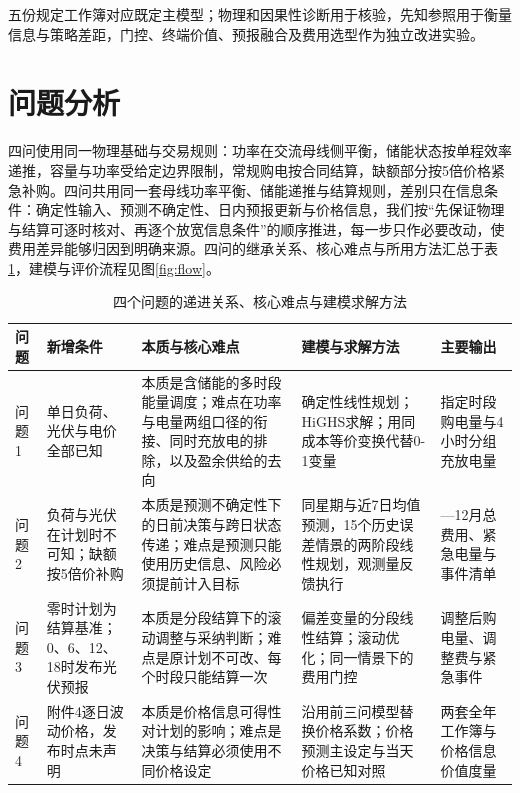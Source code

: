 \documentclass[UTF8,fontset=none,a4paper,zihao=-4]{ctexart}
\begin{document}
五份规定工作簿对应既定主模型；物理和因果性诊断用于核验，先知参照用于衡量信息与策略差距，门控、终端价值、预报融合及费用选型作为独立改进实验。

\section{问题分析}
四问使用同一物理基础与交易规则：功率在交流母线侧平衡，储能状态按单程效率递推，容量与功率受给定边界限制，常规购电按合同结算，缺额部分按5倍价格紧急补购。四问共用同一套母线功率平衡、储能递推与结算规则，差别只在信息条件：确定性输入、预测不确定性、日内预报更新与价格信息，我们按“先保证物理与结算可逐时核对、再逐个放宽信息条件”的顺序推进，每一步只作必要改动，使费用差异能够归因到明确来源。四问的继承关系、核心难点与所用方法汇总于表\ref{tab:analysis_map}，建模与评价流程见图\ref{fig:flow}。

\begin{table}[H]
\centering\footnotesize
\caption{四个问题的递进关系、核心难点与建模求解方法}
\label{tab:analysis_map}
\begin{tabular}{>{\raggedright\arraybackslash}p{0.9cm}>{\raggedright\arraybackslash}p{2.5cm}>{\raggedright\arraybackslash}p{4.0cm}>{\raggedright\arraybackslash}p{4.3cm}>{\raggedright\arraybackslash}p{2.0cm}}\toprule
问题 & 新增条件 & 本质与核心难点 & 建模与求解方法 & 主要输出\\\midrule
问题1 & 单日负荷、光伏与电价全部已知 & 本质是含储能的多时段能量调度；难点在功率与电量两组口径的衔接、同时充放电的排除，以及盈余供给的去向 & 确定性线性规划；HiGHS求解；用同成本等价变换代替0-1变量 & 指定时段购电量与4小时分组充放电量\\
问题2 & 负荷与光伏在计划时不可知；缺额按5倍价补购 & 本质是预测不确定性下的日前决策与跨日状态传递；难点是预测只能使用历史信息、风险必须提前计入目标 & 同星期与近7日均值预测，15个历史误差情景的两阶段线性规划，观测量反馈执行 & 2—12月总费用、紧急电量与事件清单\\
问题3 & 零时计划为结算基准；0、6、12、18时发布光伏预报 & 本质是分段结算下的滚动调整与采纳判断；难点是原计划不可改、每个时段只能结算一次 & 偏差变量的分段线性结算；滚动优化；同一情景下的费用门控 & 调整后购电量、调整费与紧急事件\\
问题4 & 附件4逐日波动价格，发布时点未声明 & 本质是价格信息可得性对计划的影响；难点是决策与结算必须使用不同价格设定 & 沿用前三问模型替换价格系数；价格预测主设定与当天价格已知对照 & 两套全年工作簿与价格信息价值度量\\
\bottomrule\end{tabular}
\end{table}
\end{document}
